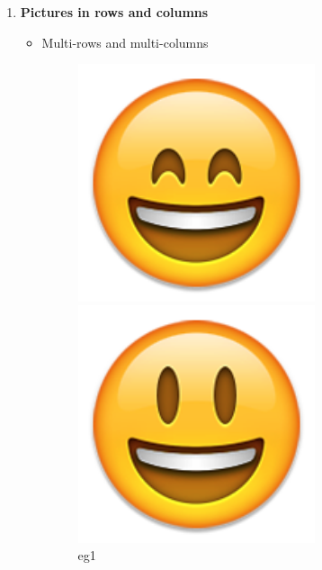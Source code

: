 \begin{solution}
\begin{enumerate}[nosep,label=(\arabic*)]
        \item \textbf{Pictures in rows and columns}
            \begin{itemize}
                \item Multi-rows and multi-columns \\
\begin{latexamplev}[]
\begin{figure}[H]
  \centering
  \begin{minipage}[b]{0.3\textwidth}
    \centering
    \includegraphics[width=0.7\textwidth]{./pic/01.png}
    \caption{eg1}
  \end{minipage}
  \begin{minipage}[b]{0.3\textwidth}
    \centering
    \includegraphics[width=0.7\textwidth]{./pic/02.png}

\end{minipage}
\end{figure}
\end{latexamplev}
\end{itemize}
\end{enumerate}
\end{solution}
